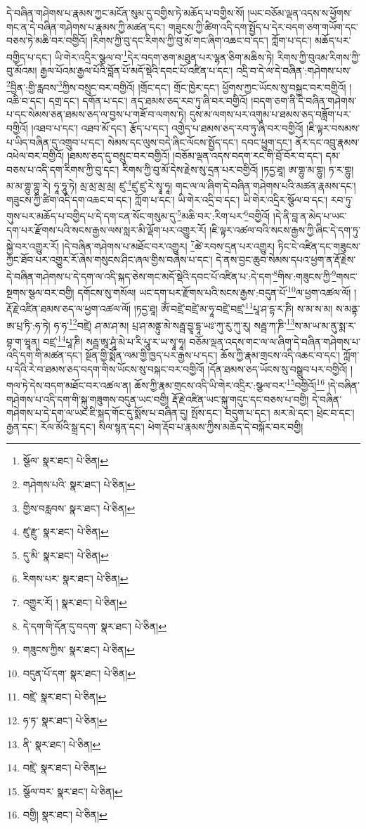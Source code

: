 དེ་བཞིན་གཤེགས་པ་རྣམས་ཀྱང་མངོན་སུམ་དུ་བགྱིས་ཏེ་མཆོད་པ་བགྱིས་སོ། །ཡང་བཅོམ་ལྡན་འདས་ས་ཕྱོགས་གང་ན་དེ་བཞིན་གཤེགས་པ་རྣམས་ཀྱི་མཚན་དང་། གཟུངས་ཀྱི་ཚིག་འདི་དག་སྤྱོད་པ་དེར་བདག་ཅག་གཡོག་དང་བཅས་ཏེ་མཆི་བར་བགྱིའོ། །རིགས་ཀྱི་བུ་དང་རིགས་ཀྱི་བུ་མོ་གང་ཞིག་འཆང་བ་དང་། ཀློག་པ་དང་། མཆོད་པར་བགྱིད་པ་དང་། ཡི་གེར་འདྲིར་སྩལ་བ་\footnote{སྩོལ་  སྣར་ཐང་།  པེ་ཅིན། }དེར་བདག་ཅག་མཐུན་པར་ལྷན་ཅིག་མཆིས་ཏེ། རིགས་ཀྱི་བུའམ་རིགས་ཀྱི་བུ་མོའམ། རྒྱལ་པོའམ་རྒྱལ་པོའི་བློན་པོ་མདོ་སྡེའི་དབང་པོ་འཛིན་པ་དང་། འདྲི་བ་དེ་ལ་དེ་བཞིན་:གཤེགས་པས་\footnote{གཤེགས་པའི་  སྣར་ཐང་།  པེ་ཅིན། }བྱིན་:གྱི་རླབས་\footnote{གྱིས་བརླབས་  སྣར་ཐང་།  པེ་ཅིན། }ཀྱིས་བསྲུང་བར་བགྱིའོ། །གྲོང་དང་། གྲོང་ཁྱེར་དང་། ཕྱོགས་ཀྱང་ཡོངས་སུ་བསྐྱང་བར་བགྱིའོ། །འཆི་བ་དང་། དགྲ་དང་། དགོན་པ་དང་། ནད་ཐམས་ཅད་རབ་ཏུ་ཞི་བར་བགྱིའོ། །བདག་ཅག་ནི་དེ་བཞིན་གཤེགས་པ་དང་སེམས་ཅན་ཐམས་ཅད་ལ་བྱས་པ་གཟོ་བ་ལགས་ཏེ། དུས་མ་ལགས་པར་འགུམ་པ་ཐམས་ཅད་བཟློག་པར་བགྱིའོ། །འཐབ་པ་དང་། འཐབ་མོ་དང་། རྩོད་པ་དང་། འགྱེད་པ་ཐམས་ཅད་རབ་ཏུ་ཞི་བར་བགྱིའོ། །ཇི་ལྟར་བསམས་པ་ཡིད་བཞིན་དུ་འགྲུབ་པ་དང་། སེམས་དང་ལུས་བདེ་ཞིང་ལོངས་སྤྱོད་དང་། དབང་ཕྱུག་དང་། ནོར་དང་འབྲུ་རྣམས་འཕེལ་བར་བགྱིའོ། །ཐམས་ཅད་དུ་བསྲུང་བར་བགྱིའོ། །བཅོམ་ལྡན་འདས་བདག་རང་གི་བྲོ་བོར་བ་དང་། དམ་བཅས་པ་འདི་དག་རིགས་ཀྱི་བུ་དང་། རིགས་ཀྱི་བུ་མོ་དེས་རྗེས་སུ་དྲན་པར་བགྱིའོ། །ཏདྱ་ཐཱ། ཨ་གྷུ་མ་གྷུ། ཏ་ར་གྷུ། མ་མ་གྷུ་གྷུ་རེ། ཧཱ་ཧཱུ་ཏེ། མྲ་མྲ་མྲ་མྲ། ཛུ་\footnote{ཛུ་རྫུ་  སྣར་ཐང་།  པེ་ཅིན། }ཛུ་ཛུ་རེ་སྭཱ་ཧཱ། གང་ལ་ལ་ཞིག་དེ་བཞིན་གཤེགས་པའི་མཚན་རྣམས་དང་། གཟུངས་ཀྱི་ཚིག་འདི་དག་འཆང་བ་དང་། ཀློག་པ་དང་། ཡི་གེར་འདྲི་བ་དང་། ཡི་གེར་འདྲིར་སྩོལ་བ་དང་། རབ་ཏུ་གུས་པར་མཆོད་པ་བགྱིད་པ་དེ་དག་ངན་སོང་གསུམ་དུ་\footnote{དུ་མི་  སྣར་ཐང་།  པེ་ཅིན། }མཆི་བར་:རིག་པར་\footnote{རིགས་པར་  སྣར་ཐང་།  པེ་ཅིན། }བགྱིའོ། །དེ་ནི་བླ་ན་མེད་པ་ཡང་དག་པར་རྫོགས་པའི་སངས་རྒྱས་ལས་སླར་མི་ལྡོག་པར་འགྱུར་རོ། །ཇི་ལྟར་འཚལ་བའི་སངས་རྒྱས་ཀྱི་ཞིང་དེ་དག་ཏུ་སྐྱེ་བར་འགྱུར་རོ། །དེ་བཞིན་གཤེགས་པ་མཐོང་བར་འགྱུར། \footnote{འགྱུར་རོ། །   སྣར་ཐང་།  པེ་ཅིན། }ཚེ་རབས་དྲན་པར་འགྱུར། ཏིང་ངེ་འཛིན་དང་གཟུངས་ཀྱང་ཐོབ་པར་འགྱུར་རོ་ཞེས་གསུངས་ཤིང་ཞལ་གྱིས་བཞེས་པ་དང་། དེ་ནས་བྱང་ཆུབ་སེམས་དཔའ་ཕྱག་ན་རྡོ་རྗེས་དེ་བཞིན་གཤེགས་པ་དེ་དག་ལ་འདི་སྐད་ཅེས་གང་མདོ་སྡེའི་དབང་པོ་འཛིན་པ་:དེ་དག་\footnote{དེ་དག་གི་དོན་དུ་བདག་  སྣར་ཐང་།  པེ་ཅིན། }གིས་:གཟུངས་ཀྱི་\footnote{གཟུངས་ཀྱིས་  སྣར་ཐང་།  པེ་ཅིན། }གསང་སྔགས་སྩལ་བར་བགྱི། དགོངས་སུ་གསོལ། ཡང་དག་པར་རྫོགས་པའི་སངས་རྒྱས་:བདུན་པོ་\footnote{བདུན་པོ་དག་  སྣར་ཐང་།  པེ་ཅིན། }ལ་ཕྱག་འཚལ་ལོ། །རྡོ་རྗེ་འཛིན་ཐམས་ཅད་ལ་ཕྱག་འཚལ་ལོ། །ཏདྱ་ཐཱ། ཨོཾ་བཛྲེ་བཛྲེ་མ་ཧཱ་བཛྲེ་བཛྲ་\footnote{བཛྲེ་  སྣར་ཐང་།  པེ་ཅིན། }པཱ་ཤ་དྷ་ར་ཎི། ས་མ་ས་མ། ས་མནྟ་ཨ་པྲ་ཏི་:ཧ་ཏེ། ཧ་ཧ་\footnote{ཧ་ཏ་  སྣར་ཐང་།  པེ་ཅིན། }བཛྲེ། ཤ་མ་ཤ་མ། པྲ་ཤ་མནྟུ་མེ་སརྦྦ་བྱཱ་དྷཱ་ཡཿ་ཀུ་རུ་ཀུ་རུ། སརྦྦ་ཀ་ཎི་\footnote{ནི་  སྣར་ཐང་།  པེ་ཅིན། }ས་མ་ཡ་མ་ནུ་སྨ་ར་བྷ་ག་ཝཱན། བཛྲ་\footnote{བཛྲེ་  སྣར་ཐང་།  པེ་ཅིན། }པཱ་ཎི། སརྦྦ་ཨཱ་ཤཱཾ་མེ་པ་རི་པཱུ་ར་ཡ་སྭཱ་ཧཱ། བཅོམ་ལྡན་འདས་གང་ལ་ལ་ཞིག་དེ་བཞིན་གཤེགས་པ་འདི་དག་གི་མཚན་དང་། སྔོན་གྱི་སྨོན་ལམ་གྱི་ཁྱད་པར་རྒྱས་པ་དང་། ཆོས་ཀྱི་རྣམ་གྲངས་འདི་འཆང་བ་དང་། ཀློག་པ་དེའི་རེ་བ་ཐམས་ཅད་བདག་གིས་ཡོངས་སུ་བསྐང་བར་བགྱིའོ། །དོན་ཐམས་ཅད་ཡོངས་སུ་བསྒྲུབ་པར་བགྱིའོ། །གལ་ཏེ་དེས་བདག་མཐོང་བར་འཚལ་ན། ཆོས་ཀྱི་རྣམ་གྲངས་འདི་ཡི་གེར་འདྲིར་:སྩལ་བར་\footnote{སྩོལ་བར་  སྣར་ཐང་།  པེ་ཅིན། }བགྱིའོ།\footnote{བགྱི།  སྣར་ཐང་།  པེ་ཅིན། } །དེ་བཞིན་གཤེགས་པ་འདི་དག་གི་སྐུ་གཟུགས་བདུན་ཡང་བགྱི། རྡོ་རྗེ་འཛིན་ཡང་སྐུ་གདུང་དང་བཅས་པ་བགྱི། དེ་བཞིན་གཤེགས་པ་དེ་དག་ལ་ཡང་ཇི་སྐད་གོང་དུ་སྨོས་པ་བཞིན་དུ། སྤོས་དང་། བདུག་པ་དང་། མར་མེ་དང་། ཕྲེང་བ་དང་། རྒྱན་དང་། རོལ་མོའི་སྒྲ་དང་། སིལ་སྙན་དང་། ཕེག་རྡོབ་པ་རྣམས་ཀྱིས་མཆོད་དེ་བསྐོར་བར་བགྱི། 